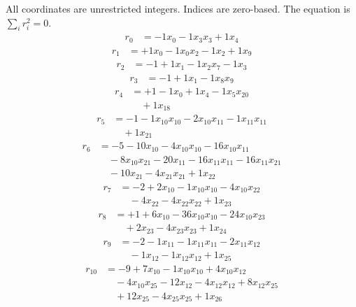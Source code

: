 \begingroup\small
All coordinates are unrestricted integers. Indices are zero-based. The equation is $\sum_i r_i^2=0$.
\[\begin{aligned}
r_{0} &= - 1 x_{0} - 1 x_{3} x_{3} + 1 x_{4}
\end{aligned}\]
\[\begin{aligned}
r_{1} &= + 1 x_{0} - 1 x_{0} x_{2} - 1 x_{2} + 1 x_{9}
\end{aligned}\]
\[\begin{aligned}
r_{2} &= - 1 + 1 x_{1} - 1 x_{2} x_{7} - 1 x_{3}
\end{aligned}\]
\[\begin{aligned}
r_{3} &= - 1 + 1 x_{1} - 1 x_{8} x_{9}
\end{aligned}\]
\[\begin{aligned}
r_{4} &= + 1 - 1 x_{0} + 1 x_{4} - 1 x_{5} x_{20} \\
 &\quad + 1 x_{18}
\end{aligned}\]
\[\begin{aligned}
r_{5} &= - 1 - 1 x_{10} x_{10} - 2 x_{10} x_{11} - 1 x_{11} x_{11} \\
 &\quad + 1 x_{21}
\end{aligned}\]
\[\begin{aligned}
r_{6} &= - 5 - 10 x_{10} - 4 x_{10} x_{10} - 16 x_{10} x_{11} \\
 &\quad - 8 x_{10} x_{21} - 20 x_{11} - 16 x_{11} x_{11} - 16 x_{11} x_{21} \\
 &\quad - 10 x_{21} - 4 x_{21} x_{21} + 1 x_{22}
\end{aligned}\]
\[\begin{aligned}
r_{7} &= - 2 + 2 x_{10} - 1 x_{10} x_{10} - 4 x_{10} x_{22} \\
 &\quad - 4 x_{22} - 4 x_{22} x_{22} + 1 x_{23}
\end{aligned}\]
\[\begin{aligned}
r_{8} &= + 1 + 6 x_{10} - 36 x_{10} x_{10} - 24 x_{10} x_{23} \\
 &\quad + 2 x_{23} - 4 x_{23} x_{23} + 1 x_{24}
\end{aligned}\]
\[\begin{aligned}
r_{9} &= - 2 - 1 x_{11} - 1 x_{11} x_{11} - 2 x_{11} x_{12} \\
 &\quad - 1 x_{12} - 1 x_{12} x_{12} + 1 x_{25}
\end{aligned}\]
\[\begin{aligned}
r_{10} &= - 9 + 7 x_{10} - 1 x_{10} x_{10} + 4 x_{10} x_{12} \\
 &\quad - 4 x_{10} x_{25} - 12 x_{12} - 4 x_{12} x_{12} + 8 x_{12} x_{25} \\
 &\quad + 12 x_{25} - 4 x_{25} x_{25} + 1 x_{26}
\end{aligned}\]
